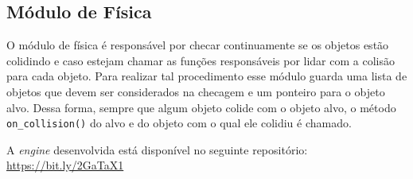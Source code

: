 \subsection{Módulo de Física}

O módulo de física é responsável por checar continuamente se os objetos estão colidindo e caso estejam chamar as funções responsáveis por lidar com a colisão para cada objeto. Para realizar tal procedimento esse módulo guarda uma lista de objetos que devem ser considerados na checagem e um ponteiro para o objeto alvo. Dessa forma, sempre que algum objeto colide com o objeto alvo, o método \texttt{on\_collision()} do alvo e do objeto com o qual ele colidiu é chamado.


A \textit{engine} desenvolvida está disponível no seguinte repositório: \url{https://bit.ly/2GaTaX1}